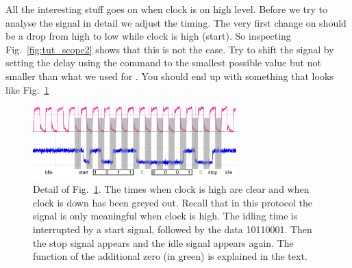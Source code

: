 \bigskip

All the interesting stuff goes on when clock is on high level. Before we try to analyse the signal in detail we adjust the timing. The very first change on  should be a drop from high to low while clock is high (start). So inspecting Fig.~\ref{fig:tut_scope2} shows that this is not the case. Try to shift the signal by setting the delay using the  command to the smallest possible value but not smaller than what we used for . You should end up with something that looks like Fig.~\ref{fig:tut_scope3}


\begin{figure}[h]
    \begin{center}
	\includegraphics[width=0.7\textwidth]{img/tut_scope3_crop.pdf}
	\caption{Detail of Fig.~\ref{fig:tut_scope3}. The times when clock is high are clear and when clock is down has been greyed out. Recall that in this protocol the signal is only meaningful when clock is high. The idling time is interrupted by a start signal, followed by the data 10110001. Then the stop signal appears and the idle signal appears again. The function of the additional zero (in green) is explained in the text.}
	\label{fig:tut_scope3}
    \end{center}
\end{figure}

